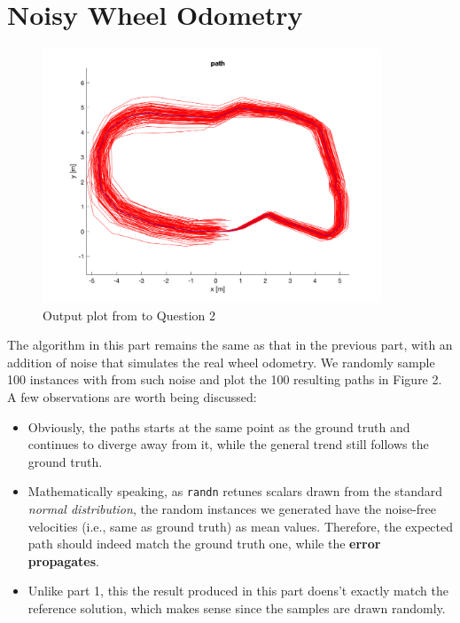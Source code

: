 \documentclass{article} %
\begin{document}
\section{Noisy Wheel Odometry} 
\begin{figure}[hbt]
  \centering
    \includegraphics[width=0.9\textwidth]{ass1_q2.png}
  \caption{Output plot from to Question 2}
\end{figure}

The algorithm in this part remains the same as that in the previous part, with an addition of noise that simulates the real wheel odometry. We randomly sample 100 instances with from such noise and plot the 100 resulting paths in Figure 2. A few observations are worth being discussed:
\begin{itemize}
    \item Obviously, the paths starts at the same point as the ground truth and continues to diverge away from it, while the general trend still follows the ground truth.
    \item Mathematically speaking, as \texttt{randn} retunes scalars drawn from the standard \textit{normal distribution}, the random instances we generated have the noise-free velocities (i.e., same as ground truth) as mean values. Therefore, the expected path should indeed match the ground truth one, while the \textbf{error propagates}.
    \item Unlike part 1, this the result produced in this part doens't exactly match the reference solution, which makes sense since the samples are drawn randomly.
\end{itemize}

\end{document}
